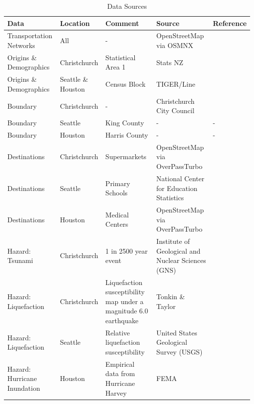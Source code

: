 \documentclass[review,3p,times,onecolumn,sort&compress,12pt]{elsarticle}
\let \cite \parencite
\begin{document}
\begin{table}[h!]
\small
\caption{Data Sources}
\begin{center}
\label{tab: data}
\begin{tabular}{p{2cm}|p{2cm}|p{4cm}|p{3cm}|p{3cm}}%
\small
Data & Location & Comment & Source & Reference \\ 
\hline
Transportation Networks & All & - & OpenStreetMap via OSMNX & \cite{OpenStreetMap, Boeing2017-nf} \\
\hline
Origins \& Demographics & Christchurch & Statistical Area 1 & Stats NZ & \cite{Stats_NZ} \\
\hline
Origins \& Demographics & Seattle \& Houston & Census Block & TIGER/Line & \cite{census:2011} \\
\hline
Boundary & Christchurch & - & Christchurch City Council & \cite{Stats_NZ} \\
\hline
Boundary & Seattle & King County & - & - \\
\hline
Boundary & Houston & Harris County & - & - \\
\hline
Destinations & Christchurch & Supermarkets & OpenStreetMap via OverPassTurbo & \cite{OpenStreetMap} \\
\hline
Destinations & Seattle & Primary Schools & National Center for Education Statistics & \cite{National_Center_for_Educational_Statistics2020-zk} \\
\hline
Destinations & Houston & Medical Centers & OpenStreetMap via OverPassTurbo & \cite{OpenStreetMap} \\
\hline
Hazard: Tsunami & Christchurch & 1 in 2500 year event & Institute of Geological and Nuclear Sciences (GNS) & \cite{Mueller2019-hk} \\
\hline
Hazard: Liquefaction & Christchurch & Liquefaction susceptibility map under a magnitude 6.0 earthquake & Tonkin \& Taylor & \cite{Tonkin_taylor2020-es} \\
\hline
Hazard: Liquefaction & Seattle & Relative liquefaction susceptibility & United States Geological Survey (USGS) & \cite{palmer2004liquefaction} \\
\hline
Hazard: Hurricane Inundation & Houston & Empirical data from Hurricane Harvey & FEMA & \cite{FEMA_Data} \\
\end{tabular}
\end{center}
\end{table}


\renewcommand\thefigure{A.\arabic{figure}} 
\end{document}
